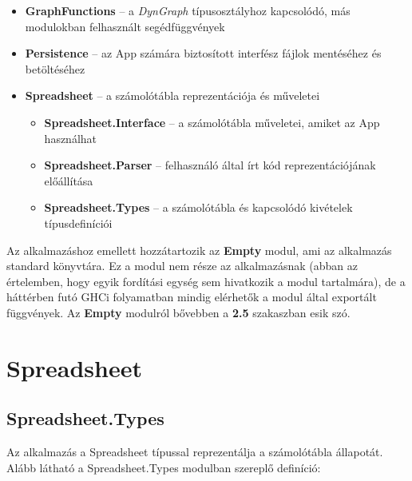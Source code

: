 \begin{itemize}
\begin{itemize}
	\end{itemize}
	\item \textbf{GraphFunctions} -- a \textit{DynGraph} típusosztályhoz kapcsolódó, más modulokban felhasznált segédfüggvények 	
	\item \textbf{Persistence} -- az App számára biztosított interfész fájlok mentéséhez és betöltéséhez
	\item \textbf{Spreadsheet} -- a számolótábla reprezentációja és műveletei
	\begin{itemize}
		\item \textbf{Spreadsheet.Interface} -- a számolótábla műveletei, amiket az App használhat
		\item \textbf{Spreadsheet.Parser} -- felhasználó által írt kód reprezentációjának előállítása
		\item \textbf{Spreadsheet.Types} -- a számolótábla és kapcsolódó kivételek típusdefiníciói
	\end{itemize}
\end{itemize} 

Az alkalmazáshoz emellett hozzátartozik az \textbf{Empty} modul, ami az alkalmazás standard könyvtára. Ez a modul nem része az alkalmazásnak (abban az értelemben, hogy egyik fordítási egység sem hivatkozik a modul tartalmára), de a háttérben futó GHCi folyamatban mindig elérhetők a modul által exportált függvények. Az \textbf{Empty} modulról bővebben a \textbf{2.5} szakaszban esik szó.

\section{Spreadsheet}

\subsection{Spreadsheet.Types}

Az alkalmazás a Spreadsheet típussal reprezentálja a számolótábla állapotát. Alább látható a Spreadsheet.Types modulban szereplő definíció:


